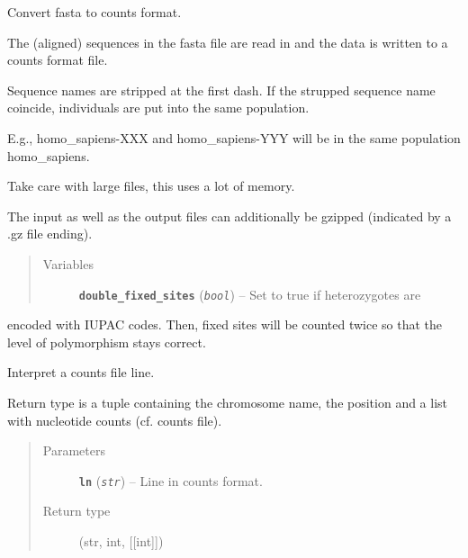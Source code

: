 \documentclass[letterpaper,10pt,english]{sphinxmanual}
\begin{document}
\begin{fulllineitems}
\label{cf:libPoMo.cf.fasta_to_cf}
Convert fasta to counts format.

The (aligned) sequences in the fasta file are read in and the data
is written to a counts format file.

Sequence names are stripped at the first dash.  If the strupped
sequence name coincide, individuals are put into the same
population.

E.g., homo\_sapiens-XXX and homo\_sapiens-YYY will be in the same
population homo\_sapiens.

Take care with large files, this uses a lot of memory.

The input as well as the output files can additionally be gzipped
(indicated by a .gz file ending).
\begin{quote}\begin{description}
\item[{Variables}] \leavevmode
\textbf{\texttt{double\_fixed\_sites}} (\emph{\texttt{bool}}) -- Set to true if heterozygotes are

\end{description}\end{quote}

encoded with IUPAC codes.  Then, fixed sites will be counted twice
so that the level of polymorphism stays correct.

\end{fulllineitems}


\begin{fulllineitems}
\label{cf:libPoMo.cf.interpret_cf_line}
Interpret a counts file line.

Return type is a tuple containing the chromosome name, the
position and a list with nucleotide counts (cf. counts file).
\begin{quote}\begin{description}
\item[{Parameters}] \leavevmode
\textbf{\texttt{ln}} (\emph{\texttt{str}}) -- Line in counts format.

\item[{Return type}] \leavevmode
(str, int, {[}{[}int{]}{]})

\end{description}\end{quote}

\end{fulllineitems}
\end{document}
